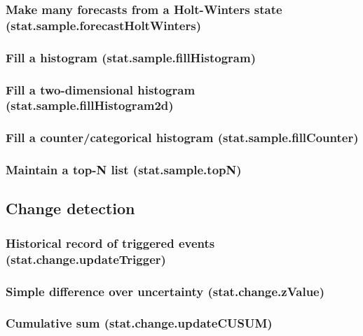 \documentclass{article}
\theoremstyle{definition}
\begin{document}
\subsubsection{Make many forecasts from a Holt-Winters state (stat.sample.forecastHoltWinters)}

\subsubsection{Fill a histogram (stat.sample.fillHistogram)}

\subsubsection{Fill a two-dimensional histogram (stat.sample.fillHistogram2d)}

\subsubsection{Fill a counter/categorical histogram (stat.sample.fillCounter)}

\subsubsection{Maintain a top-N list (stat.sample.topN)}

\subsection{Change detection}

\subsubsection{Historical record of triggered events (stat.change.updateTrigger)}

\subsubsection{Simple difference over uncertainty (stat.change.zValue)}

\subsubsection{Cumulative sum (stat.change.updateCUSUM)}
\end{document}
